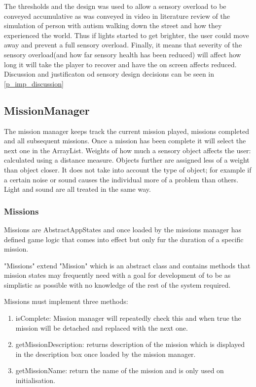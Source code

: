 \documentclass[11pt]{report}
\begin{document}
The thresholds and the design was used to allow a sensory overload to be conveyed accumulative as was conveyed in video in literature review of the simulation of person with autism walking down the street and how they experienced the world. Thus if lights started to get brighter, the user could move away and prevent a full sensory overload. Finally, it means that severity of the sensory overload(and how far sensory health has been reduced) will affect how long it will take the player to recover and have the on screen affects reduced. Discussion and justificaton od sensory design decisions can be seen in \ref{p_imp_discussion}

\subsection{MissionManager}
The mission manager keeps track the current mission played, missions completed and all subsequent missions. Once a mission has been complete it will select the next one in the ArrayList. Weights of how much a sensory object affects the user: calculated using a distance measure. Objects further are assigned less of a weight than object closer. It does not take into account the type of object; for example if a certain noise or sound causes the individual more of a problem than others. Light and sound are all treated in the same way.

\subsubsection*{Missions}
Missions are AbstractAppStates and once loaded by the missions manager has defined game logic that comes into effect but only fur the duration of a specific mission. 

"Missions" extend "Mission" which is an abstract class and contains methods that mission states may frequently need with a goal for development of to be as simplistic as possible with no knowledge of the rest of the system required.

Missions must implement three methods:
\begin{enumerate}
\item isComplete: Mission manager will repeatedly check this and when true the mission will be detached and replaced with the next one. 
\item getMissionDescription: returns description of the mission which is displayed in the description box once loaded by the mission manager. 
\item getMissionName: return the name of the mission and is only used on initialisation. 
\end{enumerate}
\end{document}

